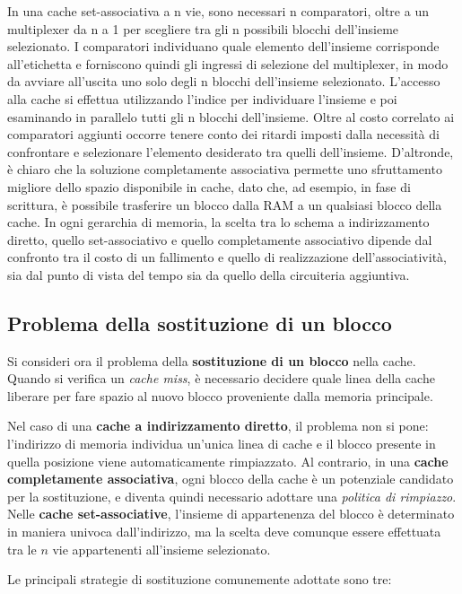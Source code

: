 \noindent In una cache set-associativa a n vie, sono necessari n comparatori, oltre a un multiplexer da n a 1 per scegliere tra gli n possibili blocchi dell'insieme selezionato. I comparatori individuano quale elemento dell'insieme corrisponde all'etichetta e forniscono quindi gli ingressi di selezione del multiplexer, in modo da avviare all'uscita uno solo degli n blocchi dell'insieme selezionato.
L'accesso alla cache si effettua utilizzando l'indice per individuare l'insieme e poi esaminando in parallelo tutti gli n blocchi dell'insieme.
Oltre al costo correlato ai comparatori aggiunti occorre tenere conto dei ritardi imposti dalla necessità di confrontare e selezionare l'elemento desiderato tra quelli dell'insieme. D'altronde, è chiaro che la soluzione completamente associativa permette uno sfruttamento migliore dello spazio disponibile in cache, dato che, ad esempio, in fase di scrittura, è possibile trasferire un blocco dalla RAM a un qualsiasi blocco della cache. In ogni
gerarchia di memoria, la scelta tra lo schema a indirizzamento diretto, quello set-associativo e quello completamente associativo dipende dal confronto tra il costo di un fallimento e quello di realizzazione dell'associatività, sia dal punto di vista del tempo sia da quello della circuiteria aggiuntiva.

\subsection{Problema della sostituzione di un blocco}
Si consideri ora il problema della \textbf{sostituzione di un blocco} nella cache. Quando si verifica un \textit{cache miss}, è necessario decidere quale linea della cache liberare per fare spazio al nuovo blocco proveniente dalla memoria principale.  

Nel caso di una \textbf{cache a indirizzamento diretto}, il problema non si pone: l'indirizzo di memoria individua un'unica linea di cache e il blocco presente in quella posizione viene automaticamente rimpiazzato. Al contrario, in una \textbf{cache completamente associativa}, ogni blocco della cache è un potenziale candidato per la sostituzione, e diventa quindi necessario adottare una \textit{politica di rimpiazzo}. Nelle \textbf{cache set-associative}, l'insieme di appartenenza del blocco è determinato in maniera univoca dall'indirizzo, ma la scelta deve comunque essere effettuata tra le $n$ vie appartenenti all'insieme selezionato.  

Le principali strategie di sostituzione comunemente adottate sono tre:  

